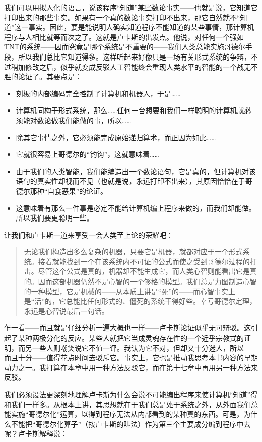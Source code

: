 我们可以用拟人化的语言，说该程序“知道”某些数论事实——也就是说，它知道它打印出来的那些事实。如果有一个真的数论事实打印不出来，那它自然就不“知道”这一事实。因此，要是能说明人确实知道程序不能知道的某些事情，那计算机程序与人相比就等而次之了。这就是卢卡斯的出发点。他说，对任何一个强如TNT的系统——因而究竟是哪个系统是不重要的——我们人类总能实施哥德尔手段，所以我们总比它知道得多。这样听起来好像只是一场有关形式系统的争辩，不过稍加修改之后，似乎就变成反驳人工智能终会重现人类水平的智能的一个战无不胜的论证了。其要点是：
\begin{itemize}
\item 刻板的内部编码完全控制了计算机和机器人，于是……
\item 计算机同构于形式系统，那么……任何一台想要和我们一样聪明的计算机就必须能对数论做我们能做的事，所以……
\item 除其它事情之外，它必须能完成原始递归算术，而正因为如此……
\item 它就很容易上哥德尔的“钓钩”，这就意味着……
\item 由于我们的人类智能，我们能编造出一个数论语句，它是真的，但计算机对该语句的真实性却视而不见（也就是说，永远打印不出来），其原因恰恰在于哥德尔那种“自食恶果”的论证。
\item 这意味着有那么一件事是必定不能给计算机编上程序来做的，而我们却能做。所以我们要更聪明一些。
\end{itemize}

让我们和卢卡斯一道来享受一会人类至上论的荣耀吧：

\begin{quote}
无论我们构造出多么复杂的机器，只要它是机器，就都对应于一个形式系统。接着就能找到一个在该系统内不可证的公式而使之受到哥德尔过程的打击。尽管这个公式是真的，机器却不能生成它，而人类心智则能看出它是真的。因而这部机器仍然不是心智的一个够格的模型。我们总是力图制造心智的一种模型，它是机械的——从本质上讲是“死”的——而心智事实上是“活”的，它总能比任何形式的、僵死的系统干得好些。幸亏哥德尔定理，永远是心智说最后一句话。
\end{quote}
乍一看——而且就是仔细分析一遍大概也一样——卢卡斯论证似乎无可辩驳。这引起了某种两极分化的反应。某些人就把它当成灵魂存在性的一个近乎宗教式的证明，而另一些人则嘲笑说它不值一评。我认为它不对，但却又十分迷人，所以——而且十分——值得花点时间去驳斥它。事实上，它也是推动我思考本书内容的早期动力之一。我打算在本章中用一种方法反驳它，而在第十七章中再用另一种方法来反驳。

我们必须设法更深刻地理解卢卡斯为什么会说不可能编出程序来使计算机“知道”得和我们一样多。从根本上讲，其思想就在于我们总是处于系统之外，从外面我们总能实施“哥德尔化”运算，以得到程序无法从内部看到的某种真的东西。可是，为什么不能把“哥德尔化算子”（按卢卡斯的叫法）作为第三个主要成分编到程序中去呢？卢卡斯解释说：

